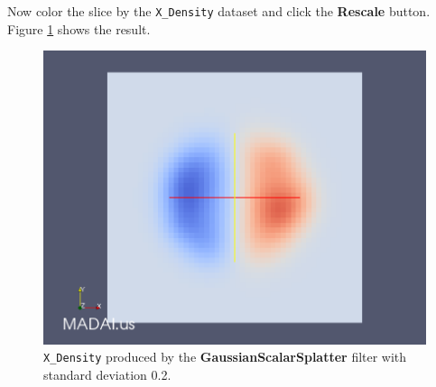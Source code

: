 \documentclass[12pt]{article}
\begin{document}
Now color the slice by the \texttt{X\_Density} dataset and click the \textbf{Rescale} button. Figure \ref{fig:GaussianScalarSplatter2} shows the result.

\begin{figure}[htbp]
   \centering
   \includegraphics[scale=.25]{images/GaussianScalarSplatterXDensity.png} %
   \caption{\texttt{X\_Density} produced by the \textbf{GaussianScalarSplatter} filter with standard deviation 0.2.}
   \label{fig:GaussianScalarSplatter2}
\end{figure}




\end{document}
